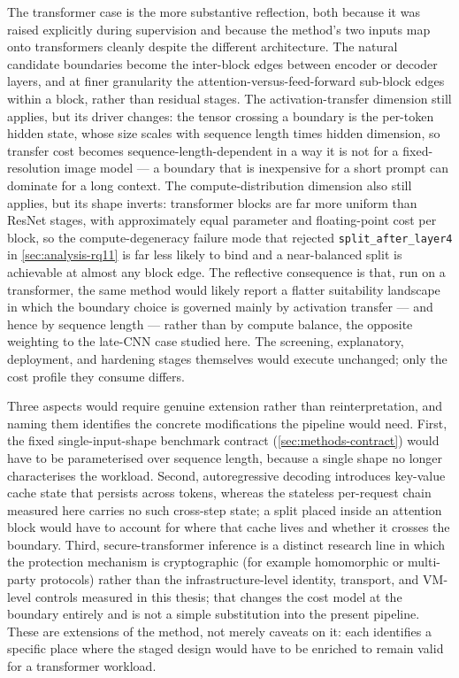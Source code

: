 The transformer case is the more substantive reflection, both because it was
raised explicitly during supervision and because the method's two inputs map
onto transformers cleanly despite the different architecture. The natural
candidate boundaries become the inter-block edges between encoder or decoder
layers, and at finer granularity the attention-versus-feed-forward sub-block
edges within a block, rather than residual stages. The activation-transfer
dimension still applies, but its driver changes: the tensor crossing a boundary
is the per-token hidden state, whose size scales with sequence length times
hidden dimension, so transfer cost becomes sequence-length-dependent in a way it
is not for a fixed-resolution image model --- a boundary that is inexpensive for
a short prompt can dominate for a long context. The compute-distribution
dimension also still applies, but its shape inverts: transformer blocks are far
more uniform than ResNet stages, with approximately equal parameter and
floating-point cost per block, so the compute-degeneracy failure mode that
rejected \texttt{split\_after\_layer4} in \cref{sec:analysis-rq11} is far less
likely to bind and a near-balanced split is achievable at almost any block
edge. The reflective consequence is that, run on a transformer, the same method
would likely report a flatter suitability landscape in which the boundary choice
is governed mainly by activation transfer --- and hence by sequence length ---
rather than by compute balance, the opposite weighting to the late-CNN case
studied here. The screening, explanatory, deployment, and hardening stages
themselves would execute unchanged; only the cost profile they consume differs.

Three aspects would require genuine extension rather than reinterpretation, and
naming them identifies the concrete modifications the pipeline would need. First,
the fixed single-input-shape benchmark contract (\cref{sec:methods-contract})
would have to be parameterised over sequence length, because a single shape no
longer characterises the workload. Second, autoregressive decoding introduces
key-value cache state that persists across tokens, whereas the stateless
per-request chain measured here carries no such cross-step state; a split placed
inside an attention block would have to account for where that cache lives and
whether it crosses the boundary. Third, secure-transformer inference is a
distinct research line in which the protection mechanism is cryptographic
(for example homomorphic or multi-party protocols) rather than the
infrastructure-level identity, transport, and VM-level controls measured in this
thesis; that changes the cost model at the boundary entirely and is not a simple
substitution into the present pipeline. These are extensions of the method, not
merely caveats on it: each identifies a specific place where the staged design
would have to be enriched to remain valid for a transformer workload.

